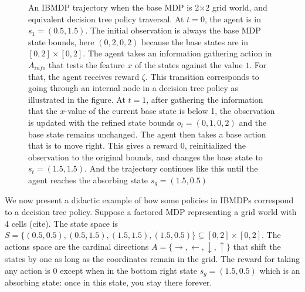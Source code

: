\begin{figure}[h]
\caption{An IBMDP trajectory when the base MDP is 2$\times$2 grid world, and equivalent decision tree policy traversal. At $t=0$, the agent is in $s_1 = (0.5, 1.5)$. The initial observation is always the base MDP state bounds, here $(0, 2, 0, 2)$ because the base states are in $[0, 2] \times [0, 2]$. The agent takes an information gathering action in $A_{info}$ that tests the feature $x$ of the states against the value $1$. For that, the agent receives reward $\zeta$. This transition corresponds to going through an internal node in a decision tree policy as illustrated in the figure. At $t=1$, after gathering the information that the $x$-value of the current base state is below 1, the observation is updated with the refined state bounds $o_t=(0, 1, 0, 2)$ and the base state remains unchanged. The agent then takes a base action that is to move right. This gives a reward 0, reinitialized the observation to the original bounds, and changes the base state to $s_t=(1.5, 1.5)$. And the trajectory continues like this until the agent reaches the absorbing state $s_g=(1.5, 0.5)$}
\label{fig:poibmdp_trajectory}
\end{figure}

We now present a didactic example of how some policies in IBMDPs correspond to a decision tree policy. 
Suppose a factored MDP representing a grid world with 4 cells (cite). The state space is $S = \{(0.5, 0.5), (0.5, 1.5), (1.5, 1.5), (1.5, 0.5)\}\subsetneq [0, 2] \times [0, 2]$.
The actions space are the cardinal directions $A = \{\rightarrow, \leftarrow, \downarrow, \uparrow\}$ that shift the states by one as long as the coordinates remain in the grid.
The reward for taking any action is 0 except when in the bottom right state $s_g = (1.5, 0.5)$ which is an absorbing state: once in this state, you stay there forever. 

